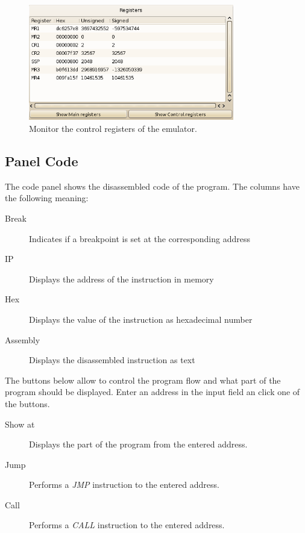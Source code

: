 \begin{figure}[H]
\begin{center}
	\includegraphics[width=0.8\textwidth]{./files/emu_gui_registers_control.png}
\end{center}
	\caption{Monitor the control registers of the emulator.}
\end{figure}

\subsection{Panel Code}
The code panel shows the disassembled code of the program. The columns have the following meaning:
\begin{description}
\item[Break] Indicates if a breakpoint is set at the corresponding address
\item[IP] Displays the address of the instruction in memory
\item[Hex] Displays the value of the instruction as hexadecimal number
\item[Assembly] Displays the disassembled instruction as text
\end{description}
The buttons below allow to control the program flow and what part of the program should be displayed. Enter an address in the input field an click one of the buttons.
\begin{description}
\item[Show at] Displays the part of the program from the entered address.
\item[Jump] Performs a \emph{JMP} instruction to the entered address.
\item[Call] Performs a \emph{CALL} instruction to the entered address.
\end{description}

